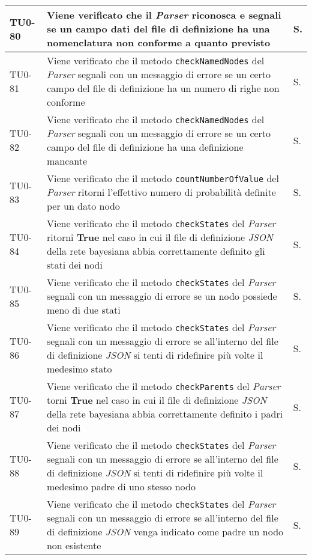 \begin{longtable}{|C{.15\textwidth}|m{.66\textwidth}|C{.10\textwidth}|}
\hline
{}TU0-80 & Viene verificato che il \textit{Parser} riconosca e segnali se un campo dati del file di definizione ha una nomenclatura non conforme a quanto previsto & S.\\
\hline
TU0-81 & Viene verificato che il metodo \texttt{checkNamedNodes} del \textit{Parser} segnali con un messaggio di errore se un certo campo del file di definizione ha un numero di righe non conforme & S.\\
\hline
{}TU0-82 & Viene verificato che il metodo \texttt{checkNamedNodes} del \textit{Parser} segnali con un messaggio di errore se un certo campo del file di definizione ha una definizione mancante & S.\\
\hline
TU0-83 & Viene verificato che il metodo \texttt{countNumberOfValue} del \textit{Parser} ritorni l'effettivo numero di probabilità definite per un dato nodo & S.\\
\hline
{}TU0-84 & Viene verificato che il metodo \texttt{checkStates} del \textit{Parser} ritorni \textbf{True} nel caso in cui il file di definizione \textit{JSON} della rete bayesiana abbia correttamente definito gli stati dei nodi & S.\\
\hline
TU0-85 & Viene verificato che il metodo \texttt{checkStates} del \textit{Parser} segnali con un messaggio di errore se un nodo possiede meno di due stati & S.\\
\hline
{}TU0-86 & Viene verificato che il metodo \texttt{checkStates} del \textit{Parser} segnali con un messaggio di errore se all'interno del file di definizione \textit{JSON} si tenti di ridefinire più volte il medesimo stato & S.\\
\hline
TU0-87 & Viene verificato che il metodo \texttt{checkParents} del \textit{Parser} torni \textbf{True} nel caso in cui il file di definizione \textit{JSON} della rete bayesiana abbia correttamente definito i padri dei nodi & S.\\
\hline
{}TU0-88 & Viene verificato che il metodo \texttt{checkStates} del \textit{Parser} segnali con un messaggio di errore se all'interno del file di definizione \textit{JSON} si tenti di ridefinire più volte il medesimo padre di uno stesso nodo & S.\\
\hline
TU0-89 & Viene verificato che il metodo \texttt{checkStates} del \textit{Parser} segnali con un messaggio di errore se all'interno del file di definizione \textit{JSON} venga indicato come padre un nodo non esistente & S.\\

\end{longtable}
